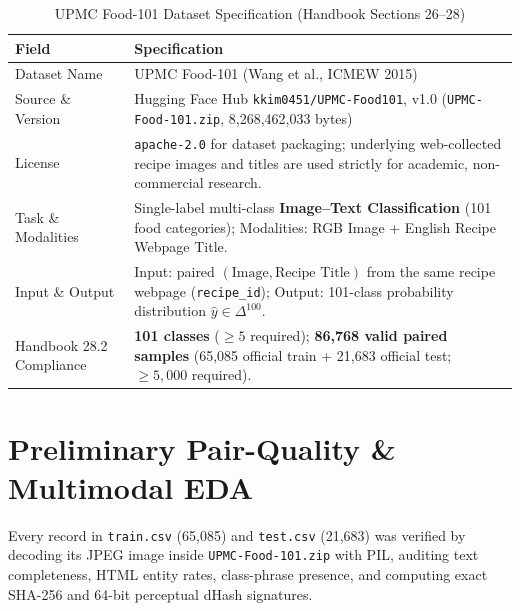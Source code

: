 \documentclass[twoside,final]{hcmut-report}
\begin{document}
\begin{table}[H]
\centering
\caption{UPMC Food-101 Dataset Specification (Handbook Sections 26--28)}
\begin{tabularx}{\linewidth}{l X}
\toprule
\textbf{Field} & \textbf{Specification} \\
\midrule
Dataset Name & UPMC Food-101 (Wang et al., ICMEW 2015) \\
Source \& Version & Hugging Face Hub \texttt{kkim0451/UPMC-Food101}, v1.0 (\texttt{UPMC-Food-101.zip}, 8,268,462,033 bytes) \\
License & \texttt{apache-2.0} for dataset packaging; underlying web-collected recipe images and titles are used strictly for academic, non-commercial research. \\
Task \& Modalities & Single-label multi-class \textbf{Image--Text Classification} (101 food categories); Modalities: RGB Image + English Recipe Webpage Title. \\
Input \& Output & Input: paired $(\text{Image}, \text{Recipe Title})$ from the same recipe webpage (\texttt{recipe\_id}); Output: 101-class probability distribution $\hat{y} \in \Delta^{100}$. \\
Handbook 28.2 Compliance & \textbf{101 classes} ($\ge 5$ required); \textbf{86,768 valid paired samples} (65,085 official train + 21,683 official test; $\ge 5,000$ required). \\
\bottomrule
\end{tabularx}
\end{table}

\section{Preliminary Pair-Quality \& Multimodal EDA}

Every record in \texttt{train.csv} (65,085) and \texttt{test.csv} (21,683) was verified by decoding its JPEG image inside \texttt{UPMC-Food-101.zip} with PIL, auditing text completeness, HTML entity rates, class-phrase presence, and computing exact SHA-256 and 64-bit perceptual dHash signatures.
\end{document}
